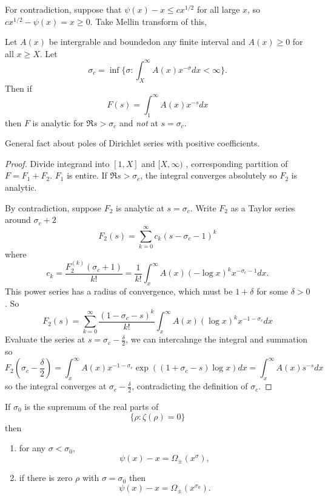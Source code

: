 \documentclass[a4paper]{article}
\theoremstyle{definition}
\begin{document}
For contradiction, suppose that \(\psi(x) - x \leq cx^{1/2}\) for all large \(x\), so \(cx^{1/2} - \psi(x) = x \geq 0\). Take Mellin transform of this,

\begin{lemma}[Landau]
  Let \(A(x)\) be intergrable and boundedon any finite interval and \(A(x) \geq 0\) for all \(x \geq X\). Let
  \[
    \sigma_c = \inf \{\sigma: \int_X^\infty A(x) x^{-\sigma} dx < \infty\}.
  \]
  Then if
  \[
    F(s) = \int_1^\infty A(x) x^{-s} dx
  \]
  then \(F\) is analytic for \(\Re s > \sigma_c\) and \emph{not} at \(s = \sigma_c\).
\end{lemma}
General fact about poles of Dirichlet series with positive coefficients.

\begin{proof}
  Divide integrand into \([1, X]\) and \([X, \infty)\) , corresponding partition of \(F = F_1 + F_2\). \(F_1\) is entire. If \(\Re s > \sigma_c\), the integral converges absolutely so \(F_2\) is analytic.

  By contradiction, suppose \(F_2\) is analytic at \(s = \sigma_c\). Write \(F_2\) as a Taylor series around \(\sigma_c + 2\)
  \[
    F_2(s) = \sum_{k = 0}^\infty c_k (s - \sigma_c - 1)^k
  \]
  where
  \[
    c_k = \frac{F_2^{(k)}(\sigma_c + 1)}{k!} = \frac{1}{k!} \int_x^\infty A(x) (-\log x)^k x^{- \sigma_c - 1} dx.
  \]
  This power series has a radius of convergence, which must be \(1 + \delta\) for some \(\delta > 0\). So
  \[
    F_2(s) = \sum_{k = 0}^\infty \frac{(1 - \sigma_c - s)^k}{k!} \int_x^\infty A(x) (\log x)^k x^{-1 - \sigma_c} dx
  \]
  Evaluate the series at \(s = \sigma_c - \frac{\delta}{2}\), we can intercahnge the integral and summation so
  \[
    F_2(\sigma_c - \frac{\delta}{2})
    = \int_x^\infty A(x) x^{-1 - \sigma_c} \exp((1 + \sigma_c - s) \log x) dx
    = \int_x^\infty A(x) s^{-s} dx
  \]
  so the integral converges at \(\sigma_c - \frac{\delta}{2}\), contradicting the definition of \(\sigma_c\).
\end{proof}

\begin{theorem}[Landau]
  If \(\sigma_0\) is the supremum of the real parts of
  \[
    \{\rho: \zeta(\rho) = 0\}
  \]
  then
  \begin{enumerate}
  \item for any \(\sigma < \sigma_0\),
    \[
      \psi(x) - x = \Omega_\pm (x^\sigma),
    \]
  \item if there is zero \(\rho\) with \(\sigma = \sigma_0\) then
    \[
      \psi(x) - x = \Omega_\pm (x^{\sigma_0}).
    \]
  \end{enumerate}
\end{theorem}
\end{document}
